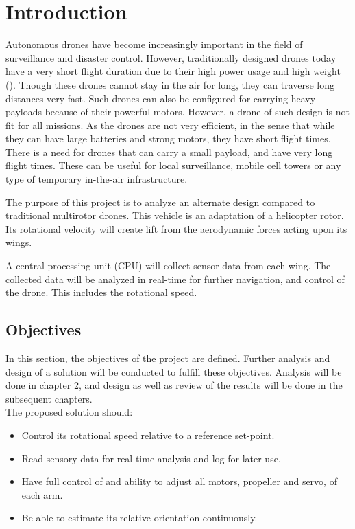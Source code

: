 \chapter{Introduction}\label{chap:introduction}

Autonomous drones have become increasingly important in the field of surveillance and disaster control. However, traditionally designed drones today have a very short flight duration due to their high power usage and high weight (\cite{mavic2}\cite{MG-1}\cite{AutelEvo}). Though these drones cannot stay in the air for long, they can traverse long distances very fast. Such drones can also be configured for carrying heavy payloads because of their powerful motors. However, a drone of such design is not fit for all missions. As the drones are not very efficient, in the sense that while they can have large batteries and strong motors, they have short flight times. There is a need for drones that can carry a small payload, and have very long flight times. These can be useful for local surveillance, mobile cell towers or any type of temporary in-the-air infrastructure.  

The purpose of this project is to analyze an alternate design compared to traditional multirotor drones. This vehicle is an adaptation of a helicopter rotor. Its rotational velocity will create lift from the aerodynamic forces acting upon its wings.

A central processing unit (CPU) will collect sensor data from each wing. The collected data will be analyzed in real-time for further navigation, and control of the drone. This includes the rotational speed.

\section{Objectives}\label{sec:objectives}
In this section, the objectives of the project are defined. Further analysis and design of a solution will be conducted to fulfill these objectives. Analysis will be done in chapter 2, and design as well as review of the results will be done in the subsequent chapters. \\
The proposed solution should:
\begin{itemize}
    \item Control its rotational speed relative to a reference set-point. 
    \item Read sensory data for real-time analysis and log for later use. 
    \item Have full control of and ability to adjust all motors, propeller and servo, of each arm.
    \item Be able to estimate its relative orientation continuously.
\end{itemize}

